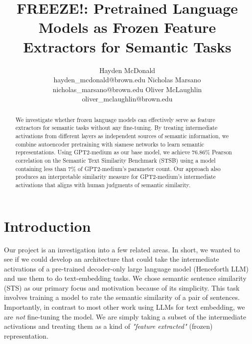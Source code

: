 \documentclass{article}
\title{FREEZE!: Pretrained Language Models as Frozen Feature Extractors for Semantic Tasks}
\author{
    Hayden McDonald\\hayden\_mcdonald@brown.edu \And
    Nicholas Marsano\\nicholas\_marsano@brown.edu\And
    Oliver McLaughlin\\oliver\_mclaughlin@brown.edu
}
\begin{document}
\maketitle

\begin{abstract}
    We investigate whether frozen language models can effectively serve as feature extractors for semantic tasks without any fine-tuning. By treating intermediate activations from different layers as independent sources of semantic information, we combine autoencoder pretraining with siamese networks to learn semantic representations. Using GPT2-medium as our base model, we achieve 76.86\% Pearson correlation on the Semantic Text Similarity Benchmark (STSB) using a model containing less than 7\% of GPT2-medium's parameter count. Our approach also produces an interpretable similarity measure for GPT2-medium's intermediate activations that aligns with human judgments of semantic similarity.
\end{abstract}

\section{Introduction}
Our project is an investigation into a few related areas. In short, we wanted to see if we could develop an architecture that could take the intermediate activations of a pre-trained decoder-only large language model (Henceforth LLM) and use them to do text-embedding tasks. We chose semantic sentence similarity (STS) as our primary focus and motivation because of its simplicity. This task involves training a model to rate the semantic similarity of a pair of sentences. Importantly, in contrast to most other work using LLMs for text embedding, we are \textit{not} fine-tuning the model. We are simply taking a subset of the intermediate activations and treating them as a kind of \textit{"feature extracted"} (frozen) representation.
\end{document}
